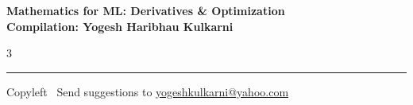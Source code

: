 \documentclass[8pt,landscape]{article}
\begin{document}
\footnotesize


\begin{center}
\Large{\textbf{Mathematics for ML: Derivatives \& Optimization\\ Compilation: Yogesh Haribhau Kulkarni}}
\end{center}

\begin{multicols}{3}

\end{multicols}

\rule{\linewidth}{0.25pt}
\scriptsize
Copyleft \textcopyleft\  Send suggestions to
\href{http://www.yogeshkulkarni.com}{yogeshkulkarni@yahoo.com}
\end{document}
